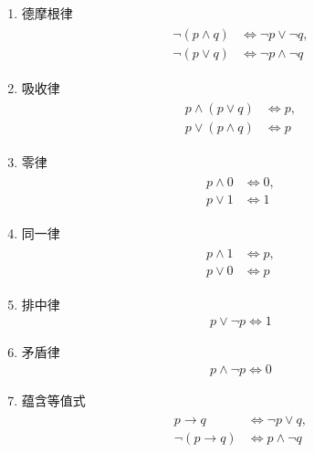 \begin{enumerate}
	\item 德摩根律
	\begin{align*}
		\begin{aligned}
			\neg(p \land q) &\Leftrightarrow \neg p \lor \neg q,\\
			\neg(p \lor q) &\Leftrightarrow \neg p \land \neg q
		\end{aligned}
	\end{align*}
	
	\item 吸收律
	\begin{align*}
		\begin{aligned}
			p \land (p \lor q) &\Leftrightarrow p,\\
			p \lor (p \land q) &\Leftrightarrow p
		\end{aligned}
	\end{align*}
	
	\item 零律
	\begin{align*}
		\begin{aligned}
			p \land 0 &\Leftrightarrow 0,\\
			p \lor 1 &\Leftrightarrow 1
		\end{aligned}
	\end{align*}
	
	\item 同一律
	\begin{align*}
		\begin{aligned}
			p \land 1 &\Leftrightarrow p,\\
			p \lor 0 &\Leftrightarrow p
		\end{aligned}
	\end{align*}
	
	\item 排中律
	\begin{align*}
		p \lor \neg p \Leftrightarrow 1
	\end{align*}
	
	\item 矛盾律
	\begin{align*}
		p \land \neg p \Leftrightarrow 0
	\end{align*}
	
	\item 蕴含等值式
	\begin{align*}
		\begin{aligned}
			p \rightarrow q &\Leftrightarrow \neg p \lor q,\\
			\neg(p \rightarrow q) &\Leftrightarrow p \land \neg q
		\end{aligned}
	\end{align*}
	

\end{enumerate}
